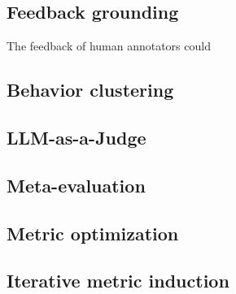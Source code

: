 \subsection{Feedback grounding}
\label{sec:grounding}
The feedback of human annotators could 


\subsection{Behavior clustering}
\label{sec:clustering}

\subsection{LLM-as-a-Judge}
\label{sec:llm-judge}

\subsection{Meta-evaluation}
\label{sec:meta-evaluation}

\subsection{Metric optimization}
\label{sec:metric-optimization}

\subsection{Iterative metric induction}
\label{sec:iterative-induction}